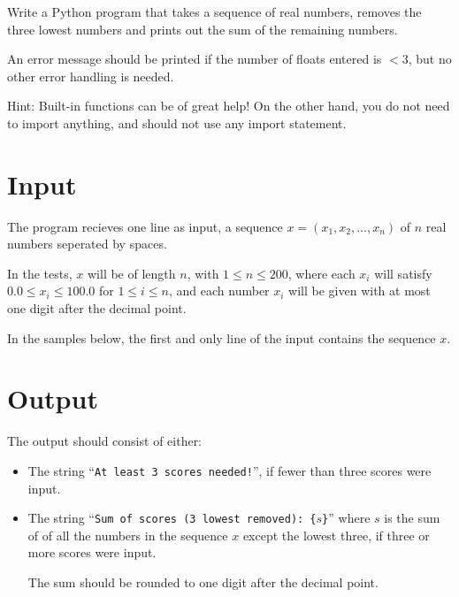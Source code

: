 
Write a Python program that takes a sequence of real numbers,
removes the three lowest numbers and prints out the sum of the remaining numbers.

An error message should be printed if the number of floats entered is $< 3$, but no other error handling is needed.

Hint: Built-in functions can be of great help!
On the other hand, you do not need to import anything,
and should not use any import statement.

\section*{Input}
The program recieves one line as input,
a sequence $x = (x_1, x_2, \dots, x_n)$ of $n$ real numbers seperated by spaces.

In the tests, $x$ will be of length $n$, with $1 \le n \le 200$,
where each $x_i$ will satisfy $0.0 \le x_i \le 100.0$ for $1 \le i \le n$,
and each number $x_i$ will be given with at most one digit after the decimal point.

In the samples below, the first and only line of the input contains the sequence $x$.

\section*{Output}
The output should consist of either:
\begin{itemize}
    \item
    The string ``\texttt{At least 3 scores needed!}'',
    if fewer than three scores were input.

    \item
    The string ``\texttt{Sum of scores (3 lowest removed): \{$s$\}}''
    where $s$ is the sum of of all the numbers in the sequence $x$
    except the lowest three,
    if three or more scores were input.

    The sum should be rounded to one digit after the decimal point.
\end{itemize}


